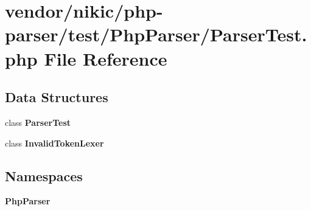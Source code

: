 \section{vendor/nikic/php-\/parser/test/\+Php\+Parser/\+Parser\+Test.php File Reference}
\label{nikic_2php-parser_2test_2_php_parser_2_parser_test_8php}
\subsection*{Data Structures}
\begin{DoxyCompactItemize}
\item 
class {\bf Parser\+Test}
\item 
class {\bf Invalid\+Token\+Lexer}
\end{DoxyCompactItemize}
\subsection*{Namespaces}
\begin{DoxyCompactItemize}
\item 
 {\bf Php\+Parser}
\end{DoxyCompactItemize}
